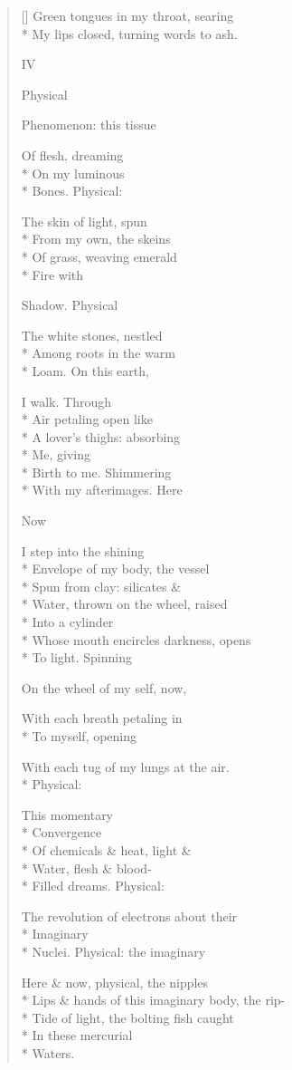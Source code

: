 \begin{verse}[\versewidth]
Green tongues in my throat, searing\\*
My lips closed, turning words to ash.

                        IV

Physical

Phenomenon:     this tissue

Of flesh, dreaming\\*
On my luminous\\*
Bones.   Physical:

The skin of light, spun\\*
From my own, the skeins\\*
Of grass, weaving emerald\\*
Fire with

Shadow.     Physical

The white stones, nestled\\*
Among roots in the warm\\*
Loam.   On this earth,

I walk.   Through\\*
Air petaling open like\\*
A lover's thighs:   absorbing\\*
Me, giving\\*
Birth to me.   Shimmering\\*
With my afterimages.     Here

Now

I step into the shining\\*
Envelope of my body, the vessel\\*
Spun from clay: silicates \&\\*
Water, thrown on the wheel, raised\\*
Into a cylinder\\*
Whose mouth encircles darkness, opens\\*
To light.   Spinning

On the wheel of my self, now,

With each breath petaling in\\*
To myself, opening

With each tug of my lungs at the air.\\*
Physical:

This momentary\\*
Convergence\\*
Of chemicals \& heat, light \&\\*
Water, flesh \& blood-\\*
Filled dreams.   Physical:

The revolution of electrons about their\\*
Imaginary\\*
Nuclei.     Physical:     the imaginary

Here \& now, physical, the nipples\\*
Lips \& hands of this imaginary body,   the rip-\\*
Tide of light, the bolting fish caught\\*
In these mercurial\\*
Waters.
\end{verse}
